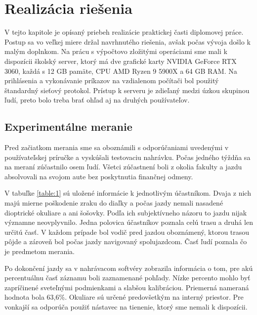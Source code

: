 \chapter{Realizácia riešenia}\label{chap:research}

V tejto kapitole je opísaný priebeh realizácie praktickej časti diplomovej práce. Postup sa vo veľkej miere držal navrhnutého riešenia, avšak počas vývoja došlo k malým doplnkom. Na prácu s výpočtovo zložitými operáciami sme mali k dispozícii školský server, ktorý má dve grafické karty NVIDIA GeForce RTX 3060, každá s 12 GB pamäte, CPU AMD Ryzen 9 5900X a 64 GB RAM. Na prihlásenia a vykonávanie príkazov na vzdialenom počítači bol použitý štandardný sieťový protokol. Prístup k serveru je zdieľaný medzi úzkou skupinou ľudí, preto bolo treba brať ohľad aj na druhých používateľov.

\section{Experimentálne meranie}

Pred začiatkom merania sme sa oboznámili s odporúčaniami uvedenými v používateľskej príručke a vyskúšali testovaciu nahrávku. Počas jedného týždňa sa na meraní zúčastnilo osem ľudí. Všetci zúčastnení boli z okolia fakulty a jazdu absolvovali na svojom aute bez poskytnutia finančnej odmeny. 

V tabuľke \ref{table:1} sú uložené informácie k jednotlivým účastníkom. Dvaja z nich majú mierne poškodenie zraku do diaľky a počas jazdy nemali nasadené dioptrické okuliare a ani šošovky. Podľa ich subjektívneho názoru to jazdu nijak významne neovplyvnilo. Jedna polovica účastníkov poznala celú trasu a druhá len určitú časť. V každom prípade bol vodič pred jazdou oboznámený, ktorou trasou pôjde a zároveň bol počas jazdy navigovaný spolujazdcom. Časť ľudí poznala čo je predmetom merania. 

Po dokončení jazdy sa v nahrávacom softvéry zobrazila informácia o tom, pre akú percentuálnu časť záznamu boli zaznamenané pohľady. Nízke percento mohlo byť zapríčinené sveteľnými podmienkami a slabšou kalibráciou. Priemerná nameraná hodnota bola 63,6\%. Okuliare sú určené predovšetkým na interný priestor. Pre vonkajší sa odporúča použiť nástavec na tienenie, ktorý sme nemali k dispozícii.


